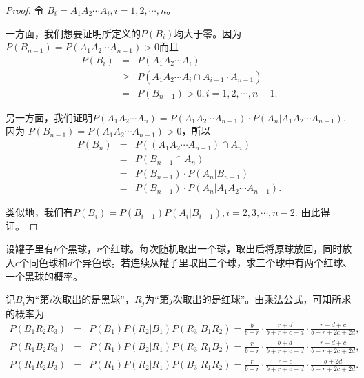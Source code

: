 \begin{proof}
令 $B_{i}=A_{1}A_{2}\cdots A_{i},i=1,2,\cdots,n$。

一方面，我们想要证明所定义的$P(B_i)$均大于零。因为
$P(B_{n-1}) = P(A_{1}A_{2}\cdots A_{n-1})>0$而且
\begin{eqnarray*}
    P(B_{i}) &=& P(A_1A_2\cdots A_i)\\
    &\ge& P(A_1A_2\cdots A_i \cap A_{i+1}\cdot A_{n-1}) \\
    & = &  P(B_{n-1}) >0, i=1,2,\cdots,n-1.
\end{eqnarray*}

另一方面，我们证明$P(A_{1}A_{2}\cdots A_{n}) = P(A_{1}A_{2}\cdots A_{n-1})\cdot P(A_n|A_{1}A_{2}\cdots A_{n-1})$.
因为 $P(B_{n-1}) = P(A_{1}A_{2}\cdots A_{n-1})>0$，所以
\begin{eqnarray*}
P(B_{n})&=&P((A_{1}A_{2}\cdots A_{n-1})\cap A_{n})\\
&=&P(B_{n-1}\cap A_{n})\\
&=&P(B_{n-1})\cdot P(A_{n}|B_{n-1})\\
&=&P(B_{n-1})\cdot P(A_{n}|A_{1}A_{2}\cdots A_{n-1}).
\end{eqnarray*}

类似地，我们有$P(B_{i}) = P(B_{i-1}) P(A_{i}|B_{i-1}),i=2,3,\cdots,n-2.$
由此得证。
\end{proof}
\newpage
\begin{example}[（罐子模型）]
设罐子里有$b$个黑球，$r$个红球。每次随机取出一个球，取出后将原球放回，同时放入$c$个同色球和$d$个异色球。若连续从罐子里取出三个球，求三个球中有两个红球、一个黑球的概率。
\end{example}
\begin{solution}
记$B_{i}$为“第$i$次取出的是黑球”，$R_{j}$为“第$j$次取出的是红球”。由乘法公式，可知所求的概率为
\begin{eqnarray*}
    P(B_{1} R_{2}R_{3})&=&P(B_{1})P(R_{2}|B_{1})P(R_{3}|B_{1}R_{2})=\frac{b}{b+r} \cdot \frac{r+d}{b+r+c+d}\cdot \frac{r+d+c}{b+r+2c+2d}, \\
P(R_{1} B_{2}R_{3})&=&P(R_{1})P(B_{2}|R_{1})P(R_{3}|R_{1}B_{2})=\frac{r}{b+r} \cdot \frac{b+d}{b+r+c+d}\cdot \frac{r+d+c}{b+r+2c+2d},  \\
P(R_{1} R_{2}B_{3})&=&P(R_{1})P(R_{2}|R_{1})P(B_{3}|R_{1}R_{2})=\frac{r}{b+r} \cdot \frac{r+c}{b+r+c+d}\cdot \frac{b+2d}{b+r+2c+2d}.
\end{eqnarray*}
\end{solution}

